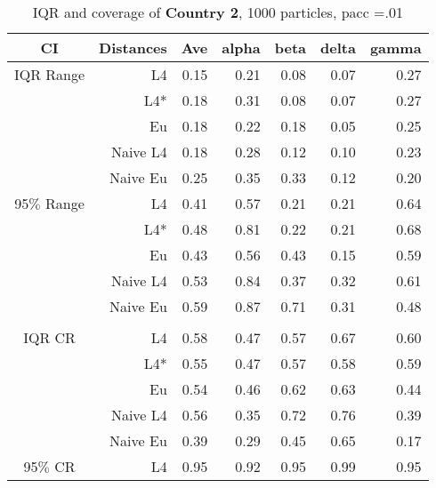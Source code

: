 \documentclass[a4paper,12pt,twoside]{book}
\begin{document}
\begin{table}[H]
\centering
\caption{IQR and coverage of \textbf{Country 2}, 1000 particles, pacc =.01}

\begin{tabular}{crrrrrr}
  \hline
{\color{blue}CI} & Distances & Ave & alpha & beta & delta & gamma \\ 
  \hline
{\color{blue}IQR Range}& L4  &0.15 & 0.21 & 0.08 & 0.07 & 0.27 \\ 
  
 &L4*  &0.18 & 0.31 & 0.08 & 0.07 & 0.27 \\ 
 
&Eu &      0.18 & 0.22 & 0.18 & 0.05 & 0.25 \\ 
 
 
&Naive L4& 0.18 & 0.28 & 0.12 & 0.10 & 0.23 \\ 
   
  
&Naive Eu &    0.25 & 0.35 & 0.33 & 0.12 & 0.20 \\ 
  
    {\color{blue}95$\%$ Range} & L4  &0.41 & 0.57 & 0.21 & 0.21 & 0.64 \\ 
  
    &L4*  & 0.48 & 0.81 & 0.22 & 0.21 & 0.68 \\ 
  
  
&Eu &  0.43 & 0.56 & 0.43 & 0.15 & 0.59 \\ 
 
  
&Naive L4&    0.53 & 0.84 & 0.37 & 0.32 & 0.61 \\ 
&Naive Eu &     0.59 & 0.87 & 0.71 & 0.31 & 0.48 \\ 
 
     \\
   \hline
   
{\color{blue} IQR CR } & L4  &0.58 & 0.47 & 0.57 & 0.67 & 0.60 \\ 
 
&L4*  &  0.55 & 0.47 & 0.57 & 0.58 & 0.59 \\ 
  
&Eu &   0.54 & 0.46 & 0.62 & 0.63 & 0.44 \\ 

&Naive L4&  0.56 & 0.35 & 0.72 & 0.76 & 0.39 \\ 
  
&Naive Eu &   0.39 & 0.29 & 0.45 & 0.65 & 0.17 \\ 
  

 {\color{blue} 95$\%$ CR } & L4  &0.95 & 0.92 & 0.95 & 0.99 & 0.95 \\ 
  

\end{tabular}
\end{table}
\end{document}
